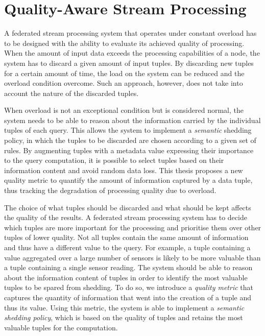 
\section{Quality-Aware Stream Processing}

A federated stream processing system that operates under constant overload has to be designed with the
ability to evaluate its achieved quality of processing. When
the amount of input data exceeds the processing capabilities of a node, the system has to discard a given amount of
input tuples. By discarding new tuples for a certain amount of time, the load on the
system can be reduced and the overload condition overcome. Such an approach, however, does not take into
account the nature of the discarded tuples. 

When overload is not an exceptional condition but is considered normal,
the system needs to be able to reason about the information carried by the individual tuples of each query. 
This allows the system to implement a \emph{semantic} shedding policy, in which the tuples to be
discarded are chosen according to a given set of rules.
By augmenting tuples with a metadata value expressing their importance to the query computation, it is
possible to select tuples based on their information content and avoid random data loss. 
This thesis proposes a new quality metric to quantify the amount of information captured by a data tuple,
thus tracking the degradation of processing quality due to overload.

The choice of what tuples should be discarded and what should be kept affects the quality of the
results. A federated stream processing system has to decide which tuples are more important for the
processing and prioritise them over other tuples of lower quality. Not all tuples contain the same
amount of information and thus have a different value to the query. For example, a tuple containing a
value aggregated over a large number of sensors is likely to be more valuable than a tuple containing a single sensor reading. The system should
be able to reason about the information content of tuples in order to identify the most valuable tuples to
be spared from shedding. To do so, we introduce a \emph{quality metric} that captures the
quantity of information that went into the creation of a tuple and thus its value. 
Using this metric, the system is able to implement a \emph{semantic shedding policy}, which is based on
the quality of tuples and retains the most valuable tuples for the computation.

